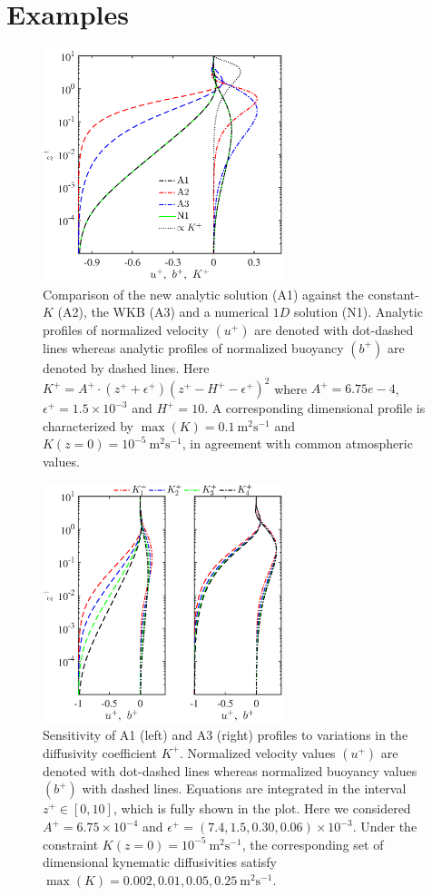 \section{Examples}
%
\begin{figure}
   \begin{center}
      \includegraphics[width= 70.0mm]{./u-b_log}
      \caption{Comparison of the new analytic solution (A1) against the constant-$K$ (A2), the WKB (A3) and a numerical $1D$ solution (N1). Analytic profiles of normalized velocity $(u^+)$ are denoted with dot-dashed lines whereas analytic profiles of normalized buoyancy $(b^+)$ are denoted by dashed lines. Here $K^+ = A^+ \cdot (z^++\epsilon^+)(z^+-H^+-\epsilon^+)^2$ where $A^+=6.75 e-4$, $\epsilon^+ =1.5 \times 10^{-3}$ and $H^+ = 10$. A corresponding dimensional profile is characterized by $\max{(K)} = 0.1 \ \mathrm{m^2s^{-1}}$ and $K(z=0) = 10^{-5} \ \mathrm{m^2s^{-1}}$, in agreement with common atmospheric values.}
      \label{fig1}
   \end{center}
\end{figure}
%
\begin{figure}
    \begin{center}
    \includegraphics[width= 70.0mm]{./u-b_log_various_K}
    \caption{Sensitivity of A1 (left) and A3 (right) profiles to variations in the diffusivity coefficient $K^+$. Normalized velocity values $(u^+)$ are denoted with dot-dashed lines whereas normalized buoyancy values $(b^+)$ with dashed lines. Equations are integrated in  the interval $z^+ \in [0,10]$, which is fully shown in the plot. Here we considered $A^+=6.75 \times 10^{-4}$ and $\epsilon^+  = (7.4,1.5,0.30,0.06) \times 10^{-3}$. Under the constraint $K(z=0) = 10^{-5} \ \mathrm{m^2s^{-1}}$, the corresponding set of dimensional kynematic diffusivities satisfy $\max{(K)}=0.002,0.01,0.05,0.25 \ \mathrm{m^2s^{-1}}$.}
    \label{fig3}
    \end{center}
\end{figure}
